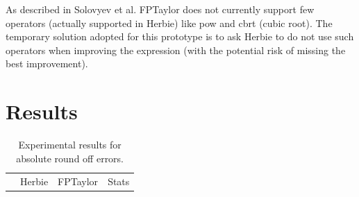 \documentclass[runningheads]{llncs}
\begin{document}
As described in Solovyev et al. FPTaylor does not currently support few operators (actually supported in Herbie) like pow and cbrt (cubic root). The temporary solution adopted for this prototype is to ask Herbie to do not use such operators when improving the expression (with the potential risk of missing the best improvement).

\section{Results}



\begin{table}[h]
	\centering
	\caption{Experimental results for absolute round off errors.}\label{tab1}
	\begin{adjustbox}{center}
	\begin{tabular}{l|c|c|c|c|c|c|c|c|c|}
		&
		\multicolumn{4}{|c|}{Herbie} & \multicolumn{2}{|c|}{FPTaylor}& \multicolumn{3}{|c|}{Stats} \\
		

\end{tabular}
\end{adjustbox}
\end{table}
\end{document}
